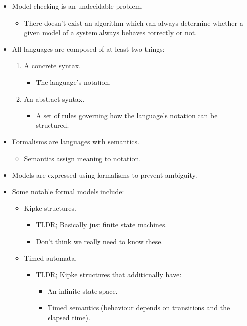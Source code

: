 \documentclass{article}
\begin{document}
\begin{itemize}
\begin{enumerate}
	\end{enumerate}
	\item Model checking is an undecidable problem.
	\begin{itemize}
		\item There doesn't exist an algorithm which can always determine whether a given model of a system always behaves correctly or not.
	\end{itemize}
	\item All languages are composed of at least two things:
	\begin{enumerate}
		\item A concrete syntax.
		\begin{itemize}
			\item The language's notation.
		\end{itemize}
		\item An abstract syntax.
		\begin{itemize}
			\item A set of rules governing how the language's notation can be structured.
		\end{itemize}
	\end{enumerate}
	\item Formalisms are languages with semantics.
	\begin{itemize}
		\item Semantics assign meaning to notation.
	\end{itemize}
	\item Models are expressed using formalisms to prevent ambiguity.
	\item Some notable formal models include:
	\begin{itemize}
		\item Kipke structures.
		\begin{itemize}
			\item TLDR; Basically just finite state machines.
			\item Don't think we really need to know these.
		\end{itemize}
		\item Timed automata.
		\begin{itemize}
			\item TLDR; Kipke structures that additionally have:
			\begin{itemize}
				\item An infinite state-space.
				\item Timed semantics (behaviour depends on transitions and the elapsed time).
			\end{itemize}

\end{itemize}
\end{itemize}
\end{itemize}
\end{document}
